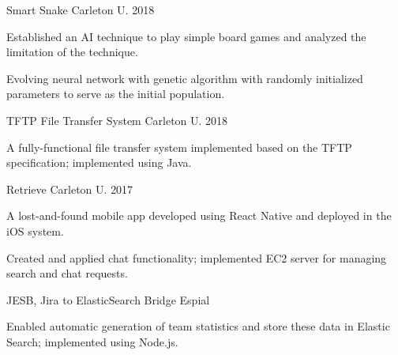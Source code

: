 \begin{cventries}

\cventry
{\textnormal{}}
{Smart Snake}
{Carleton U.}
{2018}
{\begin{cvitems}
    \item {Established an AI technique to play simple board games and analyzed the limitation of the technique.}
    \item {Evolving neural network with genetic algorithm with randomly initialized parameters to serve as the initial population.}
\end{cvitems}}

\cventry
{\textnormal{}}
{TFTP File Transfer System}
{Carleton U.}
{2018}
{\begin{cvitems}
    \item {A fully-functional file transfer system implemented based on the TFTP specification; implemented using Java.}
\end{cvitems}}

\cventry
{\textnormal{}}
{Retrieve}
{Carleton U.}
{2017}
{\begin{cvitems}
    \item {A lost-and-found mobile app developed using React Native and deployed in the iOS system.}
    \item {Created and applied chat functionality; implemented EC2 server for managing search and chat requests.}
\end{cvitems}}

\cvshortentry
{JESB, Jira to ElasticSearch Bridge}
{Espial}
{\begin{cvitems}
    \item {Enabled automatic generation of team statistics and store these data in Elastic Search; implemented using Node.js.}
\end{cvitems}}

\end{cventries}
